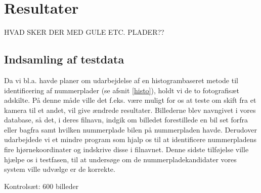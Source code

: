 \section{Resultater}

HVAD SKER DER MED GULE ETC. PLADER??
\subsection{Indsamling af testdata}





Da vi bl.a. havde planer om udarbejdelse af en histogrambaseret metode til identificering af nummerplader (se afsnit \ref{histo}), holdt vi de to fotografisæt adskilte. På denne måde ville det f.eks. være muligt for os at teste om skift fra et kamera til et andet, vil give ændrede resultater. Billederne blev navngivet i vores database, så det, i deres filnavn, indgik om billedet forestillede en bil set forfra eller bagfra samt hvilken nummerplade bilen på nummerpladen havde. Derudover udarbejdede vi et mindre program som hjalp os til at identificere nummerpladens fire hjørnekoordinater og indskrive disse i filnavnet. Denne sidste tilføjelse ville hjælpe os i testfasen, til at undersøge om de nummerpladekandidater vores system ville udvælge er de korrekte.
 
Kontrolsæt: 600 billeder



